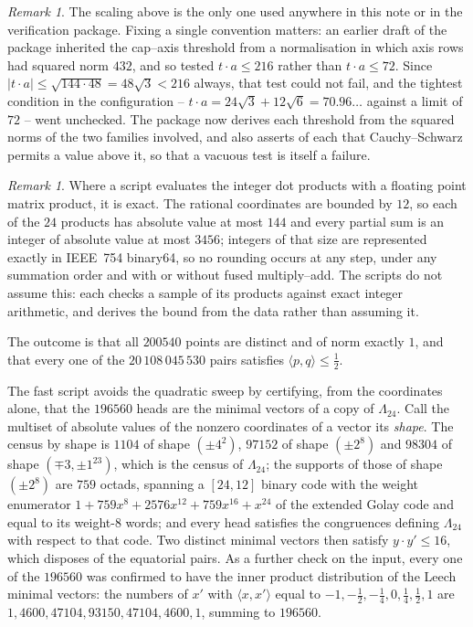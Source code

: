 \documentclass[11pt]{amsart}
\theoremstyle{remark}
\newtheorem{remark}[theorem]{Remark}
\newcommand{\Leech}{\Lambda_{24}}
\newcommand{\ip}[2]{\langle #1,#2\rangle}
\begin{document}
\begin{remark}\label{rem:scale}
The scaling above is the only one used anywhere in this note or in the
verification package. Fixing a single convention matters: an earlier
draft of the package inherited the cap--axis threshold from a normalisation in
which axis rows had squared norm $432$, and so tested $t\cdot a\le216$ rather
than $t\cdot a\le72$. Since $|t\cdot a|\le\sqrt{144\cdot48}=48\sqrt3<216$ always,
that test could not fail, and the tightest condition in the configuration --
$t\cdot a=24\sqrt3+12\sqrt6=70.96\ldots$ against a limit of $72$ -- went
unchecked. The package now derives each threshold from the squared norms of the
two families involved, and also asserts of each that Cauchy--Schwarz permits a
value above it, so that a vacuous test is itself a failure.
\end{remark}

\begin{remark}
Where a script evaluates the integer dot products with a floating point matrix
product, it is exact. The rational coordinates are bounded by $12$, so each of
the $24$ products has absolute value at most $144$ and every partial sum is an
integer of absolute value at most $3456$; integers of that size are represented
exactly in IEEE~754 binary64, so no rounding occurs at any step, under any
summation order and with or without fused multiply--add. The scripts do not
assume this: each checks a sample of its products against exact integer
arithmetic, and derives the bound from the data rather than assuming it.
\end{remark}

The outcome is that all $200540$ points are distinct and of norm exactly $1$,
and that every one of the $20\,108\,045\,530$ pairs satisfies
$\ip{p}{q}\le\tfrac12$.

The fast script avoids the quadratic sweep by certifying, from the coordinates
alone, that the $196560$ heads are the minimal vectors of a copy of $\Leech$.
Call the multiset of absolute values of the nonzero coordinates of a vector its
\emph{shape}. The census by shape is $1104$ of shape $(\pm4^{2})$, $97152$ of
shape $(\pm2^{8})$ and $98304$ of shape $(\mp3,\pm1^{23})$, which is the census
of $\Leech$; the supports of those of shape $(\pm2^{8})$ are $759$ octads,
spanning a $[24,12]$
binary code with the weight enumerator
$1+759x^{8}+2576x^{12}+759x^{16}+x^{24}$ of the extended Golay code and equal to
its weight-$8$ words; and every head satisfies the congruences defining $\Leech$
with respect to that code. Two distinct minimal vectors then satisfy
$y\cdot y'\le16$, which disposes of the equatorial pairs. As a further check on
the input, every one of the $196560$ was confirmed to have the inner product
distribution of the Leech minimal vectors: the numbers of $x'$ with
$\ip{x}{x'}$ equal to $-1,-\tfrac12,-\tfrac14,0,\tfrac14,\tfrac12,1$ are
$1,4600,47104,93150,47104,4600,1$, summing to $196560$.
\end{document}
